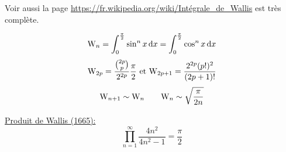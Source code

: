 Voir  aussi la page \url{https://fr.wikipedia.org/wiki/Intégrale_de_Wallis} est très complète. 

$$\mathrm{W}_n = \int_{0}^{\frac{\pi}{2}} \sin^n x \, \mathrm{d} x = \int_{0}^{\frac{\pi}{2}} \cos^n x \, \mathrm{d} x$$
$$\mathrm{W}_{2p} = \frac{\binom{2p}{p}}{2^{2p}}\frac{\pi}{2} \text{ et } \mathrm{W}_{2p+1} = \frac{2^{2p} (p!)^2}{(2p+1)!}$$
$$\mathrm{W}_{n+1} \sim \mathrm{W}_n \qquad \mathrm{W}_n \sim \sqrt{\frac{\pi}{2n}}$$

\underline{Produit de Wallis (1665):}
$$\prod_{n=1}^{\infty} \frac{4n^2}{4n^2-1} = \frac{\pi}{2}$$